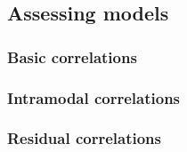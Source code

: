 \subsection{Assessing models}

\subsubsection{Basic correlations}
\subsubsection{Intramodal correlations}
\subsubsection{Residual correlations}
